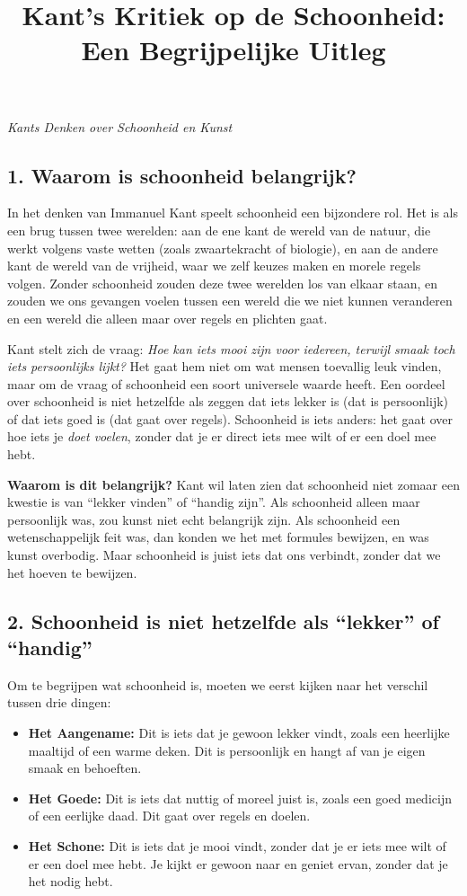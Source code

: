 \documentclass[11pt, showtrims]{memoir}
\title{Kant's Kritiek op de Schoonheid: Een Begrijpelijke Uitleg}
\begin{document}
\maketitle

\textit{Kants Denken over Schoonheid en Kunst}

\subsection*{1. Waarom is schoonheid belangrijk?}

In het denken van Immanuel Kant speelt schoonheid een bijzondere rol. Het is als een brug tussen twee werelden: aan de ene kant de wereld van de natuur, die werkt volgens vaste wetten (zoals zwaartekracht of biologie), en aan de andere kant de wereld van de vrijheid, waar we zelf keuzes maken en morele regels volgen. Zonder schoonheid zouden deze twee werelden los van elkaar staan, en zouden we ons gevangen voelen tussen een wereld die we niet kunnen veranderen en een wereld die alleen maar over regels en plichten gaat.

Kant stelt zich de vraag: \textit{Hoe kan iets mooi zijn voor iedereen, terwijl smaak toch iets persoonlijks lijkt?} Het gaat hem niet om wat mensen toevallig leuk vinden, maar om de vraag of schoonheid een soort universele waarde heeft. Een oordeel over schoonheid is niet hetzelfde als zeggen dat iets lekker is (dat is persoonlijk) of dat iets goed is (dat gaat over regels). Schoonheid is iets anders: het gaat over hoe iets je \textit{doet voelen}, zonder dat je er direct iets mee wilt of er een doel mee hebt.

\smallskip

\textbf{Waarom is dit belangrijk?}
Kant wil laten zien dat schoonheid niet zomaar een kwestie is van ``lekker vinden'' of ``handig zijn''. Als schoonheid alleen maar persoonlijk was, zou kunst niet echt belangrijk zijn. Als schoonheid een wetenschappelijk feit was, dan konden we het met formules bewijzen, en was kunst overbodig. Maar schoonheid is juist iets dat ons verbindt, zonder dat we het hoeven te bewijzen.

\subsection*{2. Schoonheid is niet hetzelfde als ``lekker'' of ``handig''}

Om te begrijpen wat schoonheid is, moeten we eerst kijken naar het verschil tussen drie dingen:

\begin{itemize}
    \item \textbf{Het Aangename:} Dit is iets dat je gewoon lekker vindt, zoals een heerlijke maaltijd of een warme deken. Dit is persoonlijk en hangt af van je eigen smaak en behoeften.
    \item \textbf{Het Goede:} Dit is iets dat nuttig of moreel juist is, zoals een goed medicijn of een eerlijke daad. Dit gaat over regels en doelen.
    \item \textbf{Het Schone:} Dit is iets dat je mooi vindt, zonder dat je er iets mee wilt of er een doel mee hebt. Je kijkt er gewoon naar en geniet ervan, zonder dat je het nodig hebt.
\end{itemize}
\end{document}
